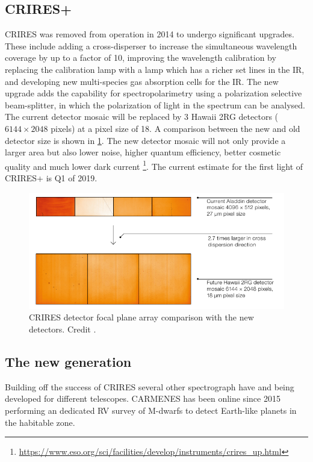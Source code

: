 \subsection{CRIRES+}
CRIRES was removed from operation in 2014 to undergo significant upgrades\citep{dorn_crires_2014}.
These include adding a cross-disperser to increase the simultaneous wavelength coverage by up to a factor of 10, improving the wavelength calibration by replacing the \thar{} calibration lamp with a \une{} lamp which has a richer set lines in the IR, and developing new multi-species gas absorption cells for the IR.
The new upgrade adds the capability for spectropolarimetry using a polarization selective beam-splitter, in which the polarization of light in the spectrum can be analysed.
The current detector mosaic will be replaced by 3 Hawaii 2RG detectors (\(6144\times 2048\) pixels) at a pixel size of 18\um{}.
A comparison between the new and old detector size is shown in \cref{fig:criresplus_detecotrs}. 
The new detector mosaic will not only provide a larger area but also lower noise, higher quantum efficiency, better cosmetic quality and much lower dark current
\footnote{\href{https://www.eso.org/sci/facilities/develop/instruments/crires_up.html}{https://www.eso.org/sci/facilities/develop/instruments/crires\_up.html}}.
The current estimate for the first light of CRIRES+ is Q1 of 2019.


\begin{figure}
    \centering
    \includegraphics[width=0.5\linewidth]{figures/advanced_material/criresplus_detectors.pdf}
    \caption{CRIRES detector focal plane array comparison with the new detectors.
    Credit \citep{dorn_crires_2014}.}
    \label{fig:criresplus_detecotrs}
\end{figure}

\subsection{The new generation}
\label{subsec:new_generation}
Building off the success of CRIRES several other \nir{} spectrograph have and being developed for different telescopes.
CARMENES has been online since 2015 performing an dedicated RV survey of M-dwarfs to detect Earth-like planets in the habitable zone. 


